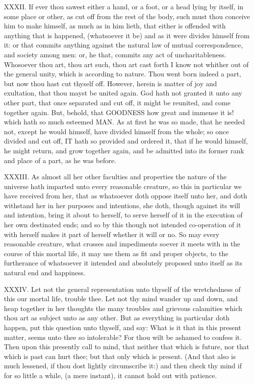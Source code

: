 XXXII. If ever thou sawest either a hand, or a foot, or a head lying by
itself, in some place or other, as cut off from the rest of the body,
such must thou conceive him to make himself, as much as in him lieth,
that either is offended with anything that is happened, (whatsoever it
be) and as it were divides himself from it: or that commits anything
against the natural law of mutual correspondence, and society among men:
or, he that, commits any act of uncharitableness. Whosoever thou art,
thou art such, thou art cast forth I know not whither out of the general
unity, which is according to nature. Thou went born indeed a part, but
now thou hast cut thyself off. However, herein is matter of joy and
exultation, that thou mayst be united again. God hath not granted it unto
any other part, that once separated and cut off, it might be reunited,
and come together again. But, behold, that GOODNESS how
great and immense it is! which hath so much esteemed MAN.
As at first he was so made, that he needed not, except he would himself,
have divided himself from the whole; so once divided and cut off,
IT hath so provided and ordered it, that if he would
himself, he might return, and grow together again, and be admitted into
its former rank and place of a part, as he was before.

XXXIII. As almost all her other faculties and properties the nature of
the universe hath imparted unto every reasonable creature, so this in
particular we have received from her, that as whatsoever doth oppose
itself unto her, and doth withstand her in her purposes and intentions,
she doth, though against its will and intention, bring it about to
herself, to serve herself of it in the execution of her own destinated
ends; and so by this though not intended co-operation of it with herself
makes it part of herself whether it will or no. So may every reasonable
creature, what crosses and impediments soever it meets with in the course
of this mortal life, it may use them as fit and proper objects, to the
furtherance of whatsoever it intended and absolutely proposed unto itself
as its natural end and happiness.

XXXIV. Let not the general representation unto thyself of the
wretchedness of this our mortal life, trouble thee. Let not thy mind
wander up and down, and heap together in her thoughts the many troubles
and grievous calamities which thou art as subject unto as any other. But
as everything in particular doth happen, put this question unto thyself,
and say: What is it that in this present matter, seems unto thee so
intolerable? For thou wilt be ashamed to confess it. Then upon this
presently call to mind, that neither that which is future, nor that which
is past can hurt thee; but that only which is present. (And that also is
much lessened, if thou dost lightly circumscribe it:) and then check thy
mind if for so little a while, (a mere instant), it cannot hold out with
patience.

